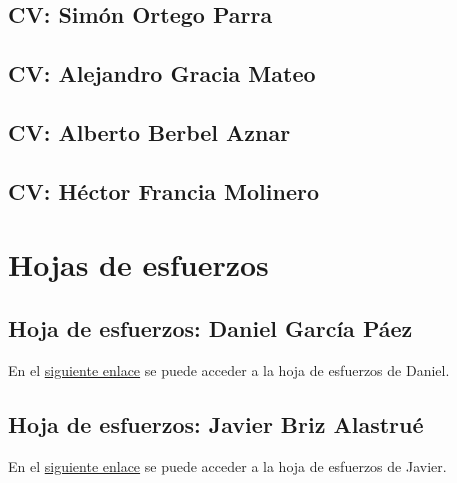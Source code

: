 \documentclass[10pt,spanish]{article}
\let\stdsection\section
\renewcommand\section{\newpage\stdsection}
\newcommand{\hojaesfuerzos}[2]{\href{run:xls/#1.xls}{#2}}
\begin{document}
\subsection{CV: Simón Ortego Parra}

\newpage

\subsection{CV: Alejandro Gracia Mateo}

\newpage

\subsection{CV: Alberto Berbel Aznar}

\newpage

\subsection{CV: Héctor Francia Molinero}

\newpage


\section{Hojas de esfuerzos}\label{sec:hojas_esfuerzos}
%
%
\subsection{Hoja de esfuerzos: Daniel García Páez}
%
En el \hojaesfuerzos{b_1_hoja_de_esfuerzos_daniel}{siguiente enlace} se puede acceder a la hoja de 
esfuerzos de Daniel.

\subsection{Hoja de esfuerzos: Javier Briz Alastrué}
%
En el \hojaesfuerzos{b_2_hoja_de_esfuerzos_javier}{siguiente enlace} se puede acceder a la hoja de 
esfuerzos de Javier.
\end{document}
